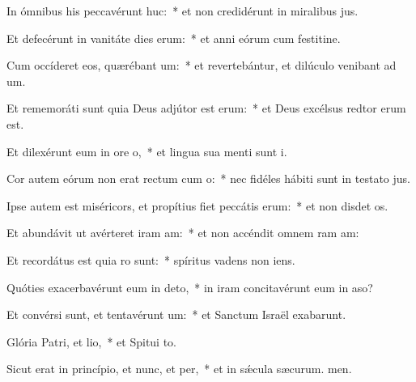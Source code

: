 \item In ómnibus his peccavérunt huc:~* et non credidérunt in miralibus jus.
\item Et defecérunt in vanitáte dies erum:~* et anni eórum cum festitine.
\item Cum occíderet eos, quærébant um:~* et revertebántur, et dilúculo venibant ad um.
\item Et rememoráti sunt quia Deus adjútor est erum:~* et Deus excélsus redtor erum est.
\item Et dilexérunt eum in ore o,~* et lingua sua menti sunt i.
\item Cor autem eórum non erat rectum cum o:~* nec fidéles hábiti sunt in testato jus.
\item Ipse autem est miséricors, et propítius fiet peccátis erum:~* et non disdet os.
\item Et abundávit ut avérteret iram am:~* et non accéndit omnem ram am:
\item Et recordátus est quia ro sunt:~* spíritus vadens  non iens.
\item Quóties exacerbavérunt eum in deto,~* in iram concitavérunt eum in aso?
\item Et convérsi sunt, et tentavérunt um:~* et Sanctum Israël exabarunt.
\item Glória Patri, et lio,~* et Spitui to.
\item Sicut erat in princípio, et nunc, et per,~* et in sǽcula sæcurum. men.
